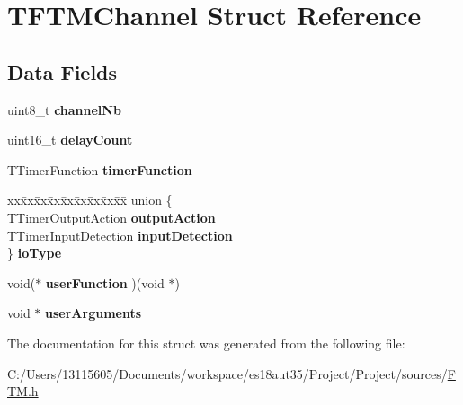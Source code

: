 \hypertarget{struct_t_f_t_m_channel}{}\section{T\+F\+T\+M\+Channel Struct Reference}
\label{struct_t_f_t_m_channel}
\subsection*{Data Fields}
\begin{DoxyCompactItemize}
\item 
\hypertarget{struct_t_f_t_m_channel_aa2404895d5318fcd6aecab3147c14826}{}uint8\+\_\+t {\bfseries channel\+Nb}\label{struct_t_f_t_m_channel_aa2404895d5318fcd6aecab3147c14826}

\item 
\hypertarget{struct_t_f_t_m_channel_abb555760e71da6a4822a1ace343381f2}{}uint16\+\_\+t {\bfseries delay\+Count}\label{struct_t_f_t_m_channel_abb555760e71da6a4822a1ace343381f2}

\item 
\hypertarget{struct_t_f_t_m_channel_aa5f3d62a353d779117ced0877fa47734}{}T\+Timer\+Function {\bfseries timer\+Function}\label{struct_t_f_t_m_channel_aa5f3d62a353d779117ced0877fa47734}

\item 
\hypertarget{struct_t_f_t_m_channel_ae805c26feb6a74fbfa4b5bafbb2d6770}{}\begin{tabbing}
xx\=xx\=xx\=xx\=xx\=xx\=xx\=xx\=xx\=\kill
union \{\\
\>TTimerOutputAction {\bfseries outputAction}\\
\>TTimerInputDetection {\bfseries inputDetection}\\
\} {\bfseries ioType}\label{struct_t_f_t_m_channel_ae805c26feb6a74fbfa4b5bafbb2d6770}
\\

\end{tabbing}\item 
\hypertarget{struct_t_f_t_m_channel_af3920191861032f55e27bd4fd42cb29a}{}void($\ast$ {\bfseries user\+Function} )(void $\ast$)\label{struct_t_f_t_m_channel_af3920191861032f55e27bd4fd42cb29a}

\item 
\hypertarget{struct_t_f_t_m_channel_a975090ae478158776d52eb24660021d6}{}void $\ast$ {\bfseries user\+Arguments}\label{struct_t_f_t_m_channel_a975090ae478158776d52eb24660021d6}

\end{DoxyCompactItemize}


The documentation for this struct was generated from the following file\+:\begin{DoxyCompactItemize}
\item 
C\+:/\+Users/13115605/\+Documents/workspace/es18aut35/\+Project/\+Project/sources/\hyperlink{_f_t_m_8h}{F\+T\+M.\+h}\end{DoxyCompactItemize}
